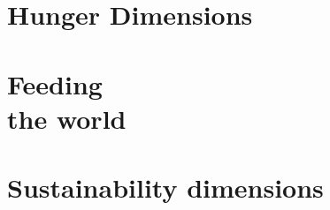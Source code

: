 \documentclass[print,Draft]{faosyb}
\begin{document}

\part{Hunger Dimensions}
\lipsum
\EndPartIntro




\begin{tablepages}
\section{}
\small
  
\clearpage

\end{tablepages}


\part[Feeding the world]{Feeding\\ the world}
\lipsum
\EndPartIntro




\begin{tablepages}
\section{}
\small
  
\clearpage

\end{tablepages}


\part[Sustainability dimensions]{Sustain\-ability dimensions}
\lipsum
\EndPartIntro




\begin{tablepages}
\section{}
\small
  
\clearpage

\end{tablepages}
\end{document}
